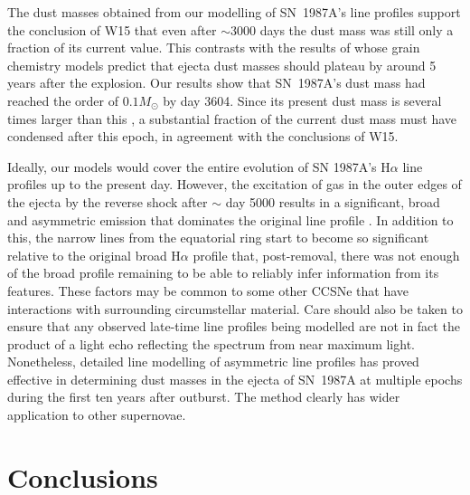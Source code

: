 \documentclass[useAMS,usenatbib,usegraphicx]{mnras}
\begin{document}
The dust masses obtained from our modelling of SN~1987A's line profiles 
support the conclusion of W15 that even after $\sim$3000 days the dust 
mass was still only a fraction of its current value. This contrasts with 
the results of \citet{Sarangi2015} whose grain chemistry models predict 
that ejecta dust masses should plateau by around 5 years after the 
explosion. Our results show that SN~1987A's dust mass had reached 
the order of $0.1M_{\odot}$ by day 3604.  Since its present dust mass is 
several times larger than this \citep{Matsuura2015, Wesson2015}, a 
substantial fraction of the current dust mass must have condensed after 
this epoch, in agreement with the conclusions of W15.



Ideally, our models would cover the entire evolution of SN 1987A's 
H$\alpha$ line profiles up to the present day.  However, the excitation of 
gas in the outer edges of the ejecta by the reverse shock after $\sim$ day 
5000 results in a significant, broad and asymmetric emission that 
dominates the original line profile \citep{Fransson2013}.  In addition to this, the 
narrow lines from the equatorial ring start to become so significant 
relative to the original broad H$\alpha$ profile that, post-removal, there 
was not enough of the broad profile remaining to be able to reliably infer 
information from its features. These factors may be common to some other 
CCSNe that have interactions with surrounding circumstellar material. Care 
should also be taken to ensure that any observed late-time line profiles 
being modelled are not in fact the product of a light echo reflecting the 
spectrum from near maximum light. Nonetheless, detailed line modelling of 
asymmetric line profiles has proved effective in determining dust masses 
in the ejecta of SN~1987A at multiple epochs during the first ten years 
after outburst. The method clearly has wider application to other 
supernovae.


\section{Conclusions}
\end{document}
